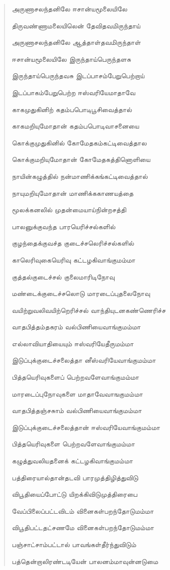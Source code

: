 \documentclass{article}
\begin{document}
\begin{quotation}
{அருணாசலந்தனிலே ஈசான்யமூலையிலே

திருவண்ணாமலையிலென் தேவிதவமிருந்தாய்

அருணாசலந்தனிலே ஆத்தாள்தவமிருந்தாள்

ஈசான்யமூலையிலே இருந்தாய்பெருந்தளசு

இருந்தாய்பெருந்தவசு இடப்பாசம்பேறுபெற்றாய்

இடப்பாகம்பேறுபெற்ற ஈஸ்வரியேமாதாவே

காகமுதுகினிற் கதம்பபொடிபூசிவைத்தால்

காகமறியுமோதான் கதம்பபொடிவாசனையை

கொக்குமுதுகினில் கோமேதகம்கட்டிவைத்தால

கொக்குமறியுமோதான் கோமேதகத்தினொளியை

நாயின்கழுத்தில்‌ நன்மாணிக்கங்கட்டிவைத்தால்‌

நாயுமறியுமோதான்‌ மாணிக்ககாணயத்தை

மூலக்கனலில் முதன்மையாய்நின்றசத்தி

பாலனுக்குவந்த பாரயெரிச்சல்களில்

குழந்தைக்குவச்த குடைச்சலெரிச்சல்களில்‌

காலெரிவுகையெரிவு கட்டழகிவாங்குமம்மா

குத்தல்குடைச்சல் குலைமாரிடிநோவு

மண்டைக்குடைச்சலொடு மாரடைப்புதலைநோவு

வயிற்றுவலிவயிற்றெரிச்சல்‌ வாந்தியுடனகண்ணெரிச்ச

வாதபித்தம்‌தகரம்‌ வல்பிணியைவாங்குமம்மா

எல்லாவியாதியையும்‌ ஈஸ்வரியேதீருமம்மா

இடுப்புக்குடைச்சலைத்தா னீஸ்வரியேவாங்குமம்மா

பித்தயெரிவுகளைப் பெற்றவளேவாங்குமம்மா

மாரடைப்புநோவுகளை மாதாவேவாஙகுமம்மா

வாதபித்தஞ்சசுாம்‌ வல்பிணியைவாங்குமம்மா

இடுப்புக்குடைச்சலைத்தான்‌ ஈஸ்வரியேவாங்குமம்மா

பித்தயெரிவுகளை பெற்றவளேவாங்குமம்மா

கழுத்துவலியதனைக் கட்டழகிவாங்குமம்மா

பத்திரையால்தான்தடவி பாரமுத்திழித்துவிடு

விபூதியைப்போட்டு யிறக்கிவிடுமுத்திரைபை

வேப்பிலைப்பட்டவிடம் வினைகள்பறந்தோடுமம்மா

விபூதிபட்டதட்சணமே வினைகள்பறந்தோடுமம்மா

பஞ்சாட்சாம்பட்டால் பாவங்கள்தீர்ந்துவிடும்

பத்தென்றாலிரண்டடியேன் பாலனம்மாவுன்னடுமை

}
\end{quotation}
\end{document}
